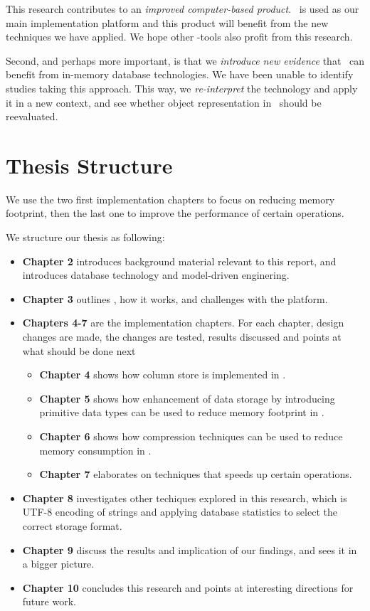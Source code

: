 This research contributes to an \textit{improved computer-based product}. \gap~is used as our main implementation platform and this product will benefit from the new techniques we have applied. We hope other \mdd-tools also profit from this research.

Second, and perhaps more important, is that we \textit{introduce new evidence} that \mde~can benefit from in-memory database technologies. We have been unable to identify studies taking this approach. This way, we \textit{re-interpret} the technology and apply it in a new context, and see whether object representation in \mde~should be reevaluated.

\section{Thesis Structure}
\label{sec:Thesis Structure}
We use the two first implementation chapters to focus on reducing memory footprint, then the last one to improve the performance of certain operations.

We structure our thesis as following:
\begin{itemize}
  \item \textbf{Chapter 2} introduces background material relevant to this report, and introduces database technology and model-driven enginering. 
  \item \textbf{Chapter 3} outlines \gap, how it works, and challenges with the platform.
  \item \textbf{Chapters 4-7} are the implementation chapters. For each chapter, design changes are made, the changes are tested, results discussed and points at what should be done next
  \begin{itemize}
    \item \textbf{Chapter 4} shows how column store is implemented in \gap.
    \item \textbf{Chapter 5} shows how enhancement of data storage by introducing primitive data types can be used to reduce memory footprint in \gap.
    \item \textbf{Chapter 6} shows how compression techniques can be used to reduce memory consumption in \gap.
    \item \textbf{Chapter 7} elaborates on techniques that speeds up certain operations.
  \end{itemize}
  \item \textbf{Chapter 8} investigates other techiques explored in this research, which is UTF-8 encoding of strings and applying database statistics to select the correct storage format.
  \item \textbf{Chapter 9} discuss the results and implication of our findings, and sees it in a bigger picture.
  \item \textbf{Chapter 10} concludes this research and points at interesting directions for future work.
\end{itemize}




